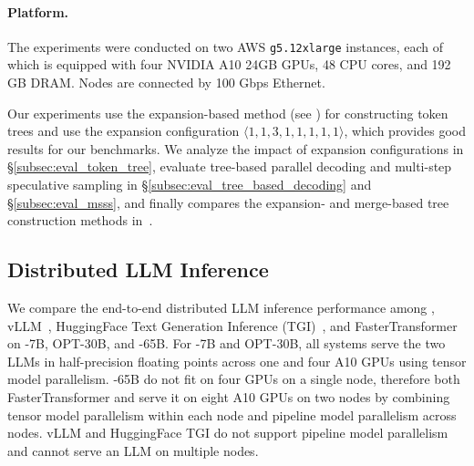 \paragraph{Platform.} The experiments were conducted on two AWS {\tt g5.12xlarge} instances, each of which is equipped with four NVIDIA A10 24GB GPUs, 48 CPU cores, and 192 GB DRAM. Nodes are connected by 100 Gbps Ethernet.

Our experiments use the expansion-based method (see ) for constructing token trees and use the expansion configuration $\langle 1, 1, 3, 1, 1, 1, 1, 1\rangle$, which provides good results for our benchmarks. We analyze the impact of expansion configurations in \S\ref{subsec:eval_token_tree}, evaluate tree-based parallel decoding and multi-step speculative sampling in \S\ref{subsec:eval_tree_based_decoding} and \S\ref{subsec:eval_msss}, and finally compares the expansion- and merge-based tree construction methods in~\cite{miao2023specinfer}.


\subsection{Distributed LLM Inference}
\label{subsec:eval_distributed}
We compare the end-to-end distributed LLM inference performance among \Sys, vLLM~\cite{vllm}, HuggingFace Text Generation Inference (TGI)~\cite{huggingface_tgi}, and FasterTransformer~\cite{fastertransformer} on \llama-7B, OPT-30B, and \llama-65B.
For \llama-7B and OPT-30B, all systems serve the two LLMs in half-precision floating points across one and four A10 GPUs using tensor model parallelism.
\llama-65B do not fit on four GPUs on a single node, therefore both FasterTransformer and \Sys serve it on eight A10 GPUs on two nodes by combining tensor model parallelism within each node and pipeline model parallelism across nodes.
vLLM and HuggingFace TGI do not support pipeline model parallelism and cannot serve an LLM on multiple nodes.

